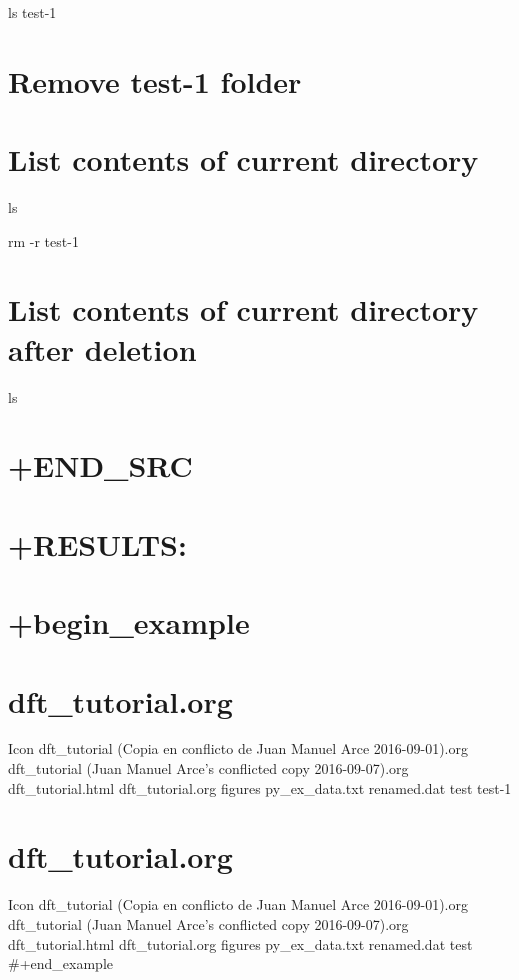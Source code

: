 \documentclass[11pt]{article}
\begin{document}
ls test-1

\section{Remove test-1 folder}\label{remove-test-1-folder}

\section{List contents of current
directory}\label{list-contents-of-current-directory}

ls

rm -r test-1

\section{List contents of current directory after
deletion}\label{list-contents-of-current-directory-after-deletion}

ls

\section{+END\_SRC}\label{end_src}

\section{+RESULTS:}\label{results-3}

\section{+begin\_example}\label{begin_example-1}

\section{dft\_tutorial.org}\label{dft_tutorial.org-1}

Icon dft\_tutorial (Copia en conflicto de Juan Manuel Arce
2016-09-01).org dft\_tutorial (Juan Manuel Arce's conflicted copy
2016-09-07).org dft\_tutorial.html dft\_tutorial.org figures
py\_ex\_data.txt renamed.dat test test-1

\section{dft\_tutorial.org}\label{dft_tutorial.org-2}

Icon dft\_tutorial (Copia en conflicto de Juan Manuel Arce
2016-09-01).org dft\_tutorial (Juan Manuel Arce's conflicted copy
2016-09-07).org dft\_tutorial.html dft\_tutorial.org figures
py\_ex\_data.txt renamed.dat test \#+end\_example
\end{document}
